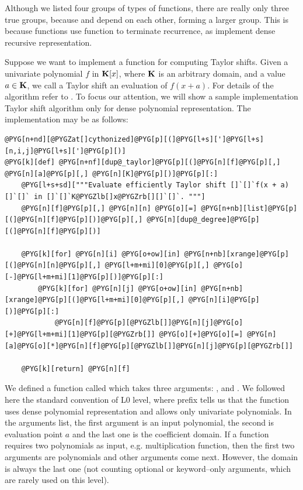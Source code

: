 Although we listed four groups of types of functions, there are really only three true groups, because
 and  depend on each other, forming a larger group. This is because  functions
use  function to terminate recurrence, as  implement dense recursive representation.

Suppose we want to implement a function for computing Taylor shifts. Given a univariate polynomial
$f$ in $\mathbf{K}[x]$, where $\mathbf{K}$ is an arbitrary domain, and a value $a \in \mathbf{K}$, we call a Taylor shift an
evaluation of $f(x + a)$. For details of the algorithm refer to \cite{Nijenhuis1978combinatorial}. To focus
our attention, we will show a sample implementation Taylor shift algorithm only for dense polynomial
representation. The implementation may be as follows:

\begin{Verbatim}[commandchars=@\[\]]
@PYG[n+nd][@PYGZat[]cythonized]@PYG[p][(]@PYG[l+s][']@PYG[l+s][n,i,j]@PYG[l+s][']@PYG[p][)]
@PYG[k][def] @PYG[n+nf][dup@_taylor]@PYG[p][(]@PYG[n][f]@PYG[p][,] @PYG[n][a]@PYG[p][,] @PYG[n][K]@PYG[p][)]@PYG[p][:]
    @PYG[l+s+sd]["""Evaluate efficiently Taylor shift []`[]`f(x + a)[]`[]` in []`[]`K@PYGZlb[]x@PYGZrb[][]`[]`. """]
    @PYG[n][f]@PYG[p][,] @PYG[n][n] @PYG[o][=] @PYG[n+nb][list]@PYG[p][(]@PYG[n][f]@PYG[p][)]@PYG[p][,] @PYG[n][dup@_degree]@PYG[p][(]@PYG[n][f]@PYG[p][)]

    @PYG[k][for] @PYG[n][i] @PYG[o+ow][in] @PYG[n+nb][xrange]@PYG[p][(]@PYG[n][n]@PYG[p][,] @PYG[l+m+mi][0]@PYG[p][,] @PYG[o][-]@PYG[l+m+mi][1]@PYG[p][)]@PYG[p][:]
        @PYG[k][for] @PYG[n][j] @PYG[o+ow][in] @PYG[n+nb][xrange]@PYG[p][(]@PYG[l+m+mi][0]@PYG[p][,] @PYG[n][i]@PYG[p][)]@PYG[p][:]
            @PYG[n][f]@PYG[p][@PYGZlb[]]@PYG[n][j]@PYG[o][+]@PYG[l+m+mi][1]@PYG[p][@PYGZrb[]] @PYG[o][+]@PYG[o][=] @PYG[n][a]@PYG[o][*]@PYG[n][f]@PYG[p][@PYGZlb[]]@PYG[n][j]@PYG[p][@PYGZrb[]]

    @PYG[k][return] @PYG[n][f]
\end{Verbatim}
\noindent
We defined a function called  which takes three arguments: ,  and . We
followed here the standard convention of L0 level, where  prefix tells us that the function
uses dense polynomial representation and allows only univariate polynomials. In the arguments list,
the first argument is an input polynomial, the second is evaluation point $a$ and the last one is
the coefficient domain. If a function requires two polynomials as input, e.g. multiplication function,
then the first two arguments are polynomials and other arguments come next. However, the domain is
always the last one (not counting optional or keyword--only arguments, which are rarely used on
this level).

